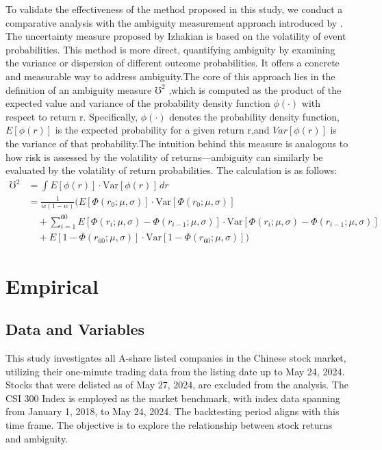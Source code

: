 \documentclass[preprint,12pt,authoryear]{elsarticle}
\begin{document}
To validate the effectiveness of the method proposed in this study, we conduct a comparative analysis with the ambiguity measurement approach introduced by \cite{izhakian2020}. The uncertainty measure proposed by Izhakian is based on the volatility of event probabilities. This method is more direct, quantifying ambiguity by examining the variance or dispersion of different outcome probabilities. It offers a concrete and measurable way to address ambiguity.The core of this approach lies in the definition of an ambiguity measure $\mho^2$ ,which is computed as the product of the expected value and variance of the probability density function $\phi(\cdot)$ with respect to return r. Specifically, $\phi(\cdot)$
denotes the probability density function, $E[\phi(r)]$ is the expected probability for a given return r,and $Var[\phi(r)]$ is the variance of that probability.The intuition behind this measure is analogous to how risk is assessed by the volatility of returns—ambiguity can similarly be evaluated by the volatility of return probabilities. The calculation is as follows:
\begin{equation}
\begin{aligned}
\mho^2 &= \int E[\phi(r)] \cdot \text{Var}[\phi(r)] \, dr \\
       &= \frac{1}{w(1-w)} \bigg( E[\Phi(r_0;\mu,\sigma)] \cdot \text{Var}[\Phi(r_0;\mu,\sigma)] \\
       &\quad + \sum_{i=1}^{60} E[\Phi(r_i;\mu,\sigma) - \Phi(r_{i-1};\mu,\sigma)] \cdot \text{Var}[\Phi(r_i;\mu,\sigma) - \Phi(r_{i-1};\mu,\sigma)] \\
       &\quad + E[1-\Phi(r_{60};\mu,\sigma)] \cdot \text{Var}[1-\Phi(r_{60};\mu,\sigma)] \bigg)
\end{aligned}
\end{equation}



\section{Empirical}
\subsection{Data and Variables}

This study investigates all A-share listed companies in the Chinese stock market, utilizing their one-minute trading data from the listing date up to May 24, 2024. Stocks that were delisted as of May 27, 2024, are excluded from the analysis. The CSI 300 Index is employed as the market benchmark, with index data spanning from January 1, 2018, to May 24, 2024. The backtesting period aligns with this time frame. The objective is to explore the relationship between stock returns and ambiguity.
\end{document}
